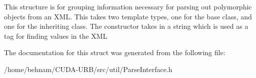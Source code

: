 This structure is for grouping information necessary for parsing out polymorphic objects from an X\+ML. This takes two template types, one for the base class, and one for the inheriting class. The constructor takes in a string which is used as a tag for finding values in the X\+ML 

The documentation for this struct was generated from the following file\+:\begin{DoxyCompactItemize}
\item 
/home/behnam/\+C\+U\+D\+A-\/\+U\+R\+B/src/util/Parse\+Interface.\+h\end{DoxyCompactItemize}

